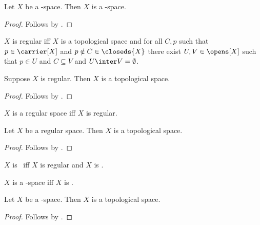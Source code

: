 \begin{proposition}\label{teetwo_space_is_teeone_space}
    Let $X$ be a \teetwo-space.
    Then $X$ is a \teeone-space.
\end{proposition}
\begin{proof}
    Follows by .
\end{proof}

\begin{definition}\label{is_regular}
    $X$ is regular iff $X$ is a topological space and
        for all $C,p$ such that
            $p\in\carrier[X]$ and $p\notin C\in\closeds{X}$ there exist
            $U,V\in\opens[X]$ such that $p\in U$ and $C\subseteq V$ and
            $U\inter V=\emptyset$.
\end{definition}

\begin{classification}\label{regular_is_topological}
    Suppose $X$ is regular.
    Then $X$ is a topological space.
\end{classification}
\begin{proof}
    Follows by .
\end{proof}

\begin{abbreviation}\label{regular_space}
    $X$ is a regular space iff $X$ is regular.
\end{abbreviation}

\begin{classification}\label{regular_space_is_topological}
    Let $X$ be a regular space.
    Then $X$ is a topological space.
\end{classification}
\begin{proof}
    Follows by .
\end{proof}


\begin{abbreviation}\label{teethree}
    $X$ is \teethree\ iff $X$ is regular and $X$ is \teezero.
\end{abbreviation}

\begin{abbreviation}\label{teethree_space}
    $X$ is a \teethree-space iff $X$ is \teethree.
\end{abbreviation}

\begin{classification}\label{teethree_space_is_topological}
    Let $X$ be a \teethree-space.
    Then $X$ is a topological space.
\end{classification}
\begin{proof}
    Follows by .
\end{proof}


